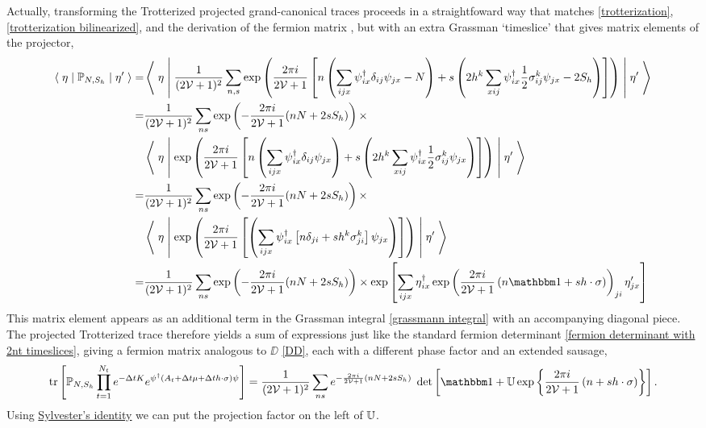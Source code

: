 Actually, transforming the Trotterized projected grand-canonical traces proceeds in a straightfoward way that matches \eqref{trotterization}, \eqref{trotterization bilinearized}, and the derivation of the fermion matrix , but with an extra Grassman `timeslice' that gives matrix elements of the projector,
\begin{align}
	\matrixElement{\eta}{ \PP_{N, S_h} }{\eta'}
	=&
	\matrixElement{\eta}{
		\oneover{(2\Volume+1)^2}\sum_{n,s} \exp\left(\frac{2\pi i}{2\Volume+1}\left[ n \left(\sum_{ijx}\psi\adjoint_{ix} \delta_{ij}\psi_{jx} -N\right) + s \left(2 h^k \sum_{xij}\psi\adjoint_{ix} \half \sigma_{ij}^k \psi_{jx} - 2S_h\right)\right]\right)
	}{\eta'}
	\nonumber\\
	=&
	\oneover{(2\Volume+1)^2}\sum_{ns} \exp\left(-\frac{2\pi i}{2\Volume+1} (nN+2s S_h)\right)\times
	\nonumber\\
	&\matrixElement{\eta}{
		\exp\left(\frac{2\pi i}{2\Volume+1}\left[ n \left(\sum_{ijx}\psi\adjoint_{ix} \delta_{ij}\psi_{jx}\right) + s \left(2 h^k \sum_{xij}\psi\adjoint_{ix} \half \sigma_{ij}^k \psi_{jx}\right)\right]\right)
	}{\eta'}
	\nonumber\\
	=&
	\oneover{(2\Volume+1)^2}\sum_{ns} \exp\left(-\frac{2\pi i}{2\Volume+1} (nN+2s S_h)\right)\times
	\nonumber\\
	&\matrixElement{\eta}{
		\exp\left(\frac{2\pi i}{2\Volume+1}\left[ \left(\sum_{ijx}\psi\adjoint_{ix}\left[n \delta_{ji} + s h^k\sigma_{ji}^k\right]\psi_{jx}\right) \right]\right)
	}{\eta'}
	\nonumber\\
	=&
	\oneover{(2\Volume+1)^2}\sum_{ns} \exp\left(-\frac{2\pi i}{2\Volume+1} (nN+2s S_h)\right)\times
	\exp\left[
		\sum_{ijx}
		\eta\adjoint_{ix}
			\exp\left( \frac{2\pi i}{2\Volume+1} \left(n\one + s h\cdot \sigma\right) \right)_{ji}
		\eta'_{jx}
	\right]
\end{align}
This matrix element appears as an additional term in the Grassman integral \eqref{grassmann integral} with an accompanying diagonal piece.
The projected Trotterized trace therefore yields a sum of expressions just like the standard fermion determinant \eqref{fermion determinant with 2nt timeslices}, giving a fermion matrix analogous to $\DD$ \eqref{DD}, each with a different phase factor and an extended sausage,
\begin{align}
	\tr{\PP_{N,S_h} \prod_{t=1}^{N_t} e^{-\Delta t K}e^{\psi\adjoint\left(A_t + \Delta t \mu + \Delta t h\cdot\sigma\right)\psi}}
	=
	\oneover{(2\Volume+1)^2} \sum_{ns} e^{-\frac{2\pi i}{2\Volume+1} (nN+2sS_h)}\; \det\left[ \one + \UU \exp\left\{ \frac{2\pi i}{2\Volume+1}\left(n + s h \cdot \sigma\right)\right\}\right].
\end{align}
Using \href{https://en.wikipedia.org/wiki/Determinant#Sylvester's\_determinant\_theorem}{Sylvester's identity} we can put the projection factor on the left of $\mathbb{U}$.

